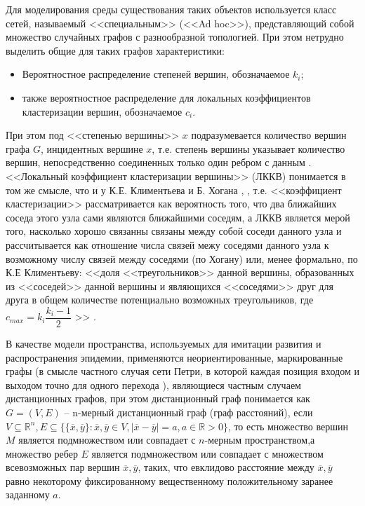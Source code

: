 Для моделирования среды существования таких объектов используется класс сетей, называемый <<специальным>> (<<Ad hoc>>), представляющий собой множество случайных графов с разнообразной топологией. При этом нетрудно выделить общие для таких графов характеристики: 
\begin{itemize}
	\item Вероятностное распределение степеней вершин, обозначаемое $k_i$;
	\item также вероятностное распределение для локальных коэффициентов кластеризации вершин, обозначаемое $c_i$.
\end{itemize}
При этом под <<степенью вершины>> 	$x$ подразумевается количество вершин графа $G$, инцидентных вершине $x$, т.е. степень вершины указывает количество вершин, непосредственно соединенных только один ребром с данным %
\cite[с. 5]{DiestelR:2005} .
<<Локальный 	коэффициент кластеризации вершины>> (ЛККВ) понимается в том же смысле, что и у К.Е. Климентьева и Б. Хогана %
\cite{Klimentiev:2015}, \cite{Hogan:2017}, т.е. <<коэффициент кластеризации>> рассматривается как вероятность того, что два ближайших соседа этого узла сами являются ближайшими соседям, а ЛККВ является мерой того, насколько хорошо связанны связаны между собой соседи данного узла и рассчитывается как отношение
числа связей межу соседями данного узла к возможному числу связей между соседями  (по Хогану) или, менее формально, по К.Е Климентьеву: <<доля <<треугольников>> данной вершины, образованных из <<соседей>> данной вершины и являющихся <<соседями>> друг для друга в общем количестве потенциально возможных треугольников, где $c_{max}=k_i\dfrac{k_i-1}{2}$ >> \cite{Klimentiev:2015}.


В качестве модели пространства, используемых для имитации развития и распространения эпидемии, применяются неориентированные, маркированные графы (в смысле частного случая сети Петри, в которой каждая позиция входом и выходом точно для одного перехода %
\cite[с. 200]{Piterson:1981} ), являющиеся частным случаем дистанционных графов, при этом дистанционный граф понимается как $G = (V,E)$ -- n-мерный дистанционный граф  (граф расстояний), если $V \subseteq \mathbb{R}^n, E \subseteq \{\{\overline{x}, \overline{y} \}: \overline{x}, \overline{y} \in V, |\overline{x} - \overline{y}| = a, a \in \mathbb{R} > 0 \}$, то есть множество вершин $M$ является подмножеством или совпадает с  $n$-мерным пространством,а множество ребер $E$ является подмножеством или совпадает с множеством всевозможных пар вершин $\overline{x}, \overline{y}$, таких, что  евклидово расстояние между $\overline{x}, \overline{y}$ равно некоторому фиксированному вещественному положительному заранее заданному $a$. 

